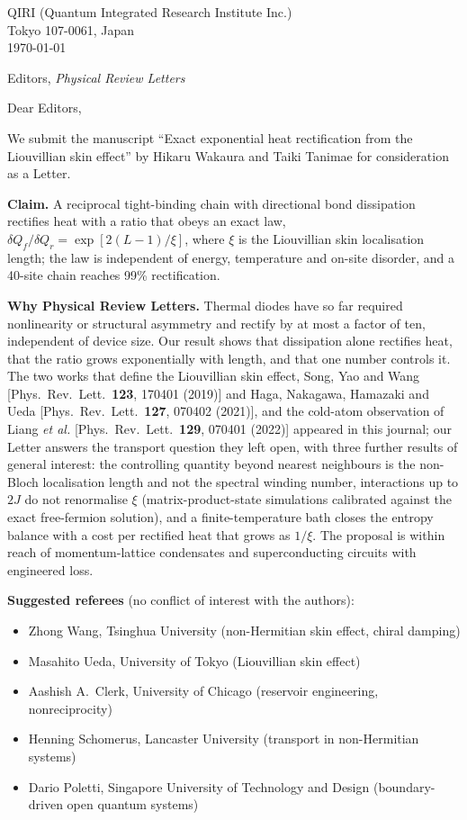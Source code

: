 \documentclass[11pt]{article}
\begin{document}
\noindent QIRI (Quantum Integrated Research Institute Inc.)\\
Tokyo 107-0061, Japan\\
\today

\bigskip
\noindent Editors, \textit{Physical Review Letters}

\bigskip
\noindent Dear Editors,

\medskip
We submit the manuscript ``Exact exponential heat rectification from the Liouvillian skin effect'' by Hikaru Wakaura and Taiki Tanimae for consideration as a Letter.

\medskip
\noindent\textbf{Claim.} A reciprocal tight-binding chain with directional bond dissipation rectifies heat with a ratio that obeys an exact law, $\delta Q_f/\delta Q_r=\exp[2(L-1)/\xi]$, where $\xi$ is the Liouvillian skin localisation length; the law is independent of energy, temperature and on-site disorder, and a 40-site chain reaches 99\% rectification.

\medskip
\noindent\textbf{Why Physical Review Letters.} Thermal diodes have so far required nonlinearity or structural asymmetry and rectify by at most a factor of ten, independent of device size. Our result shows that dissipation alone rectifies heat, that the ratio grows exponentially with length, and that one number controls it. The two works that define the Liouvillian skin effect, Song, Yao and Wang [Phys.\ Rev.\ Lett.\ \textbf{123}, 170401 (2019)] and Haga, Nakagawa, Hamazaki and Ueda [Phys.\ Rev.\ Lett.\ \textbf{127}, 070402 (2021)], and the cold-atom observation of Liang \textit{et al.} [Phys.\ Rev.\ Lett.\ \textbf{129}, 070401 (2022)] appeared in this journal; our Letter answers the transport question they left open, with three further results of general interest: the controlling quantity beyond nearest neighbours is the non-Bloch localisation length and not the spectral winding number, interactions up to $2J$ do not renormalise $\xi$ (matrix-product-state simulations calibrated against the exact free-fermion solution), and a finite-temperature bath closes the entropy balance with a cost per rectified heat that grows as $1/\xi$. The proposal is within reach of momentum-lattice condensates and superconducting circuits with engineered loss.

\medskip
\noindent\textbf{Suggested referees} (no conflict of interest with the authors):
\begin{itemize}\setlength{\itemsep}{0pt}
\item Zhong Wang, Tsinghua University (non-Hermitian skin effect, chiral damping)
\item Masahito Ueda, University of Tokyo (Liouvillian skin effect)
\item Aashish A.\ Clerk, University of Chicago (reservoir engineering, nonreciprocity)
\item Henning Schomerus, Lancaster University (transport in non-Hermitian systems)
\item Dario Poletti, Singapore University of Technology and Design (boundary-driven open quantum systems)
\end{itemize}
\end{document}
